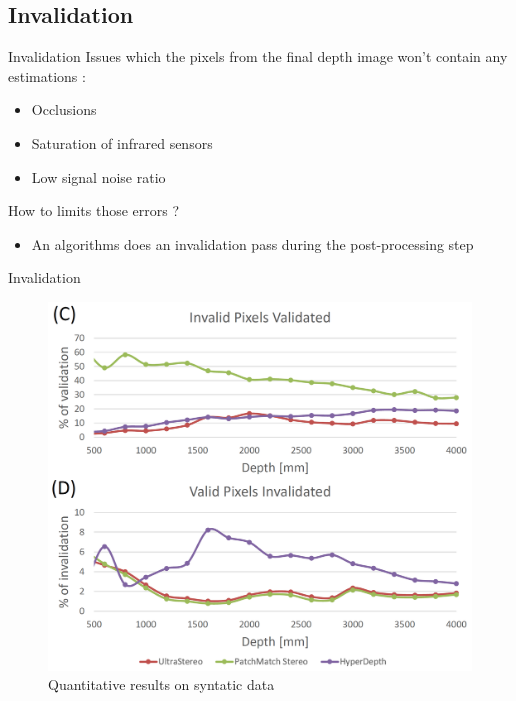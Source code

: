 %
%

\subsection{Invalidation}
\begin{frame}{Invalidation}
Issues which the pixels from the final depth image won't contain any estimations :
\begin{itemize}
\item Occlusions
\item Saturation of infrared sensors
\item Low signal noise ratio
\end{itemize}
How to limits those errors ?
\begin{itemize}
\item An algorithms does an invalidation pass during the post-processing step
\end{itemize}
\end{frame}

\begin{frame}{Invalidation}
\begin{figure}
\includegraphics[scale=0.25]{pictures/invalidation}
\caption{Quantitative results on syntatic data}
\end{figure}
\end{frame}

